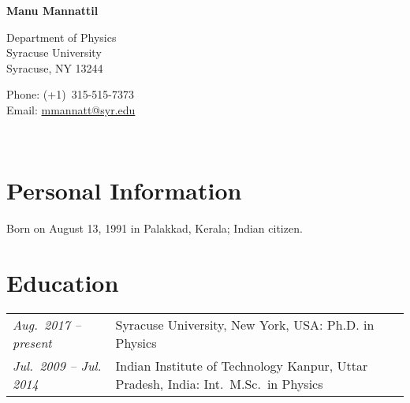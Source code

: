\documentclass[10pt]{article}
\newcommand{\fname}{Manu Mannattil}             %
\providecommand{\email}[1]{\href{mailto:#1}{#1}}
\begin{document}

{\bfseries\large\fname}
\medskip

\begin{minipage}[t]{0.45\textwidth}
  Department of Physics\\
  Syracuse University\\
  Syracuse, NY 13244
\end{minipage}
%
\begin{minipage}[t]{0.45\textwidth}
  Phone: (+1)~315-515-7373\\
  Email: \email{mmannatt@syr.edu}
\end{minipage}\\


\section*{Personal Information}

Born on August 13, 1991 in Palakkad, Kerala; Indian citizen.


\section*{Education}

\begin{tabular}{@{}ll}
  \emph{Aug.~2017 -- present}   & Syracuse University, New York, USA: Ph.D. in Physics\\
  \emph{Jul.~2009 -- Jul. 2014} & Indian Institute of Technology Kanpur, Uttar Pradesh, India: Int.~M.Sc.~in Physics\\
\end{tabular}
\end{document}
